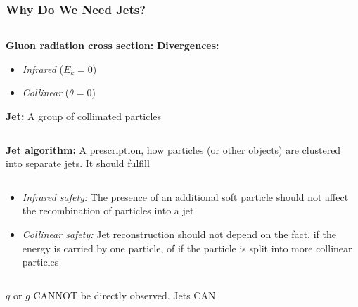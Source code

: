 \documentclass[compress]{beamer}
\begin{document}
\begin{frame}
\frametitle{Why Do We Need Jets?}
\begin{columns}[onlytextwidth]
  \begin{column}{0.5\textwidth}
    \textbf{Gluon radiation cross section:}
    \textbf{Divergences:}
    \begin{itemize}
      \item \textit{\color{red}Infrared} ($E_k = 0$)
      \item \textit{\color{red}Collinear} ($\theta = 0$)
    \end{itemize}
    \textbf{Jet:} A group of collimated particles
  \end{column}
  \begin{column}{0.5\textwidth}
    \begin{equation*}
      \sigma_{q \rightarrow qg} \sim \frac{d\theta}{|\sin\theta|}
      \frac{dE_k}{E_k}
    \end{equation*}
    \begin{figure}[b]
      \centering
      \texttt{[image: \{../PrezentationATLASmeeting/gluonRadiation]}.png}
    \end{figure}
  \end{column}
\end{columns}
\textbf{Jet algorithm:} A prescription, how particles (or other objects) are clustered
  into separate jets. It should fulfill
\begin{columns}[onlytextwidth]
  \begin{column}{0.7\textwidth}
      \begin{itemize}
        \item \textit{Infrared safety:} The presence of an additional soft particle
          should not affect the recombination of particles into a jet
        \item \textit{Collinear safety:} Jet reconstruction should not depend on the
          fact, if the energy is carried by one particle, of if the particle is
          split into more collinear particles
      \end{itemize}
  \end{column}
  \begin{column}{0.3\textwidth}
    \begin{figure}[b]
      \centering
      \texttt{[image: \{../PrezentationATLASmeeting/clustering]}.png}
    \end{figure}
  \end{column}
\end{columns}
$q$ or $g$ {\color{red}CANNOT} be directly observed. Jets {\color{red}CAN}
\end{frame}
\end{document}
